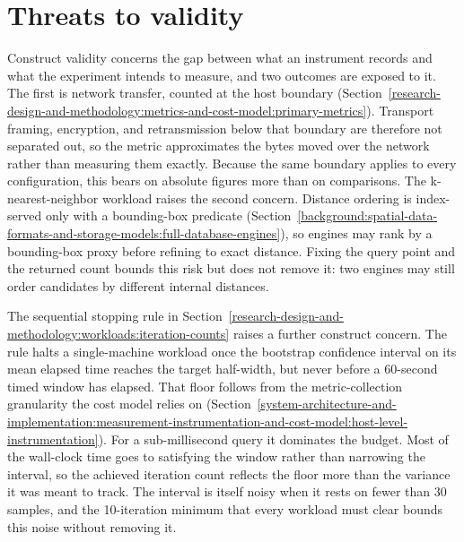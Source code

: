 \section{Threats to validity}
\label{research-design-and-methodology:threats-to-validity}

Construct validity concerns the gap between what an instrument records and what the experiment intends to measure, and two outcomes are exposed to it. The first is network transfer, counted at the host boundary (Section~\ref{research-design-and-methodology:metrics-and-cost-model:primary-metrics}). Transport framing, encryption, and retransmission below that boundary are therefore not separated out, so the metric approximates the bytes moved over the network rather than measuring them exactly. Because the same boundary applies to every configuration, this bears on absolute figures more than on comparisons. The k-nearest-neighbor workload raises the second concern. Distance ordering is index-served only with a bounding-box predicate (Section~\ref{background:spatial-data-formats-and-storage-models:full-database-engines}), so engines may rank by a bounding-box proxy before refining to exact distance. Fixing the query point and the returned count bounds this risk but does not remove it: two engines may still order candidates by different internal distances.

The sequential stopping rule in Section~\ref{research-design-and-methodology:workloads:iteration-counts} raises a further construct concern. The rule halts a single-machine workload once the bootstrap confidence interval on its mean elapsed time reaches the target half-width, but never before a \num{60}-second timed window has elapsed. That floor follows from the metric-collection granularity the cost model relies on (Section~\ref{system-architecture-and-implementation:measurement-instrumentation-and-cost-model:host-level-instrumentation}). For a sub-millisecond query it dominates the budget. Most of the wall-clock time goes to satisfying the window rather than narrowing the interval, so the achieved iteration count reflects the floor more than the variance it was meant to track. The interval is itself noisy when it rests on fewer than \num{30} samples, and the \num{10}-iteration minimum that every workload must clear bounds this noise without removing it.


